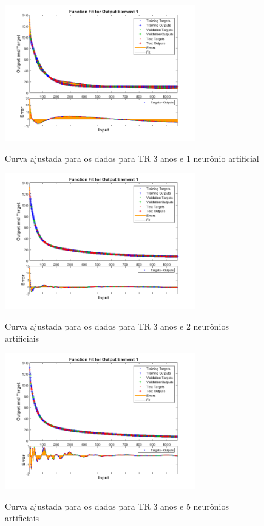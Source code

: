 \begin{figure}[h]
    \caption{Curva ajustada para os dados para TR 3 anos e 1 neurônio artificial}
    \centering
    \includegraphics[width=0.74\textwidth]{Textuais/Figuras/NN/tr3-1neuronio.png}
    \label{fig:tr3-1n}
\end{figure}

\begin{figure}[h]
    \caption{Curva ajustada para os dados para TR 3 anos e 2 neurônios artificiais}
    \centering
    \includegraphics[width=0.74\textwidth]{Textuais/Figuras/NN/tr3-2neuronio.png}
    \label{fig:tr3-2n}
\end{figure}

\begin{figure}[h]
    \caption{Curva ajustada para os dados para TR 3 anos e 5 neurônios artificiais}
    \centering
    \includegraphics[width=0.74\textwidth]{Textuais/Figuras/NN/tr3-5neuronio.png}
    \label{fig:tr3-5n}
\end{figure}

